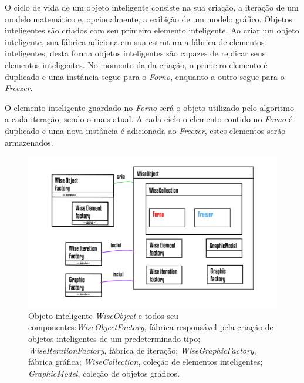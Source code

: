 \documentclass[a4paper,12pt]{monografia}
\theoremstyle{plain}
\theoremstyle{definition}
\theoremstyle{remark}
\begin{document}
O ciclo de vida de um objeto inteligente consiste na sua criação, a iteração de um modelo matemático e, opcionalmente, a exibição de um modelo gráfico. Objetos inteligentes são criados com seu primeiro elemento inteligente. Ao criar um objeto inteligente, sua fábrica adiciona em sua estrutura a fábrica de elementos inteligentes, desta forma objetos inteligentes são capazes de replicar seus elementos inteligentes. No momento da da criação, o primeiro elemento é duplicado e uma instância segue para o \textit{Forno}, enquanto a outro segue para o \textit{Freezer}.

O elemento inteligente guardado no \textit{Forno} será o objeto utilizado pelo algoritmo a cada iteração, sendo o mais atual. A cada ciclo o elemento contido no \textit{Forno} é duplicado e uma nova instância é adicionada ao \textit{Freezer}, estes elementos serão armazenados.

\begin{figure}[!htbp]
	\centering
	\includegraphics[scale=1]{Figures/WiseObject.png}
	\caption{Objeto inteligente \textit{WiseObject} e todos seu componentes:\textit{WiseObjectFactory}, fábrica responsável pela criação de objetos inteligentes de um predeterminado tipo; \textit{WiseIterationFactory}, fábrica de iteração; \textit{WiseGraphicFactory}, fábrica gráfica; \textit{WiseCollection}, coleção de elementos inteligentes; \textit{GraphicModel}, coleção de objetos gráficos.}
	\label{fig7:wiseobject}
\end{figure}
\end{document}
